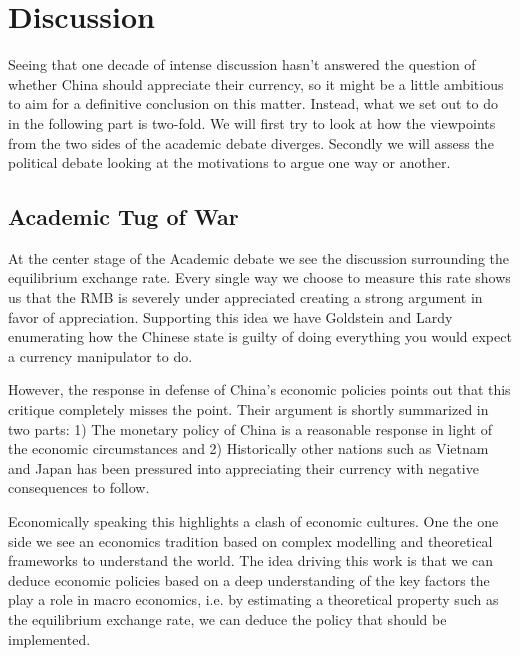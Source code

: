 \section{Discussion}
\label{sec:discussion}





Seeing that one decade of intense discussion hasn't answered the 
question of whether China should appreciate their currency, so it might 
be a little ambitious to aim for a definitive conclusion on this matter.  
Instead, what we set out to do in the following part is two-fold. We 
will first try to look at how the viewpoints from the two sides of the 
academic debate diverges. Secondly we will assess the political debate 
looking at the motivations to argue one way or another.

\subsection{Academic Tug of War}

At the center stage of the Academic debate we see the discussion 
surrounding the equilibrium exchange rate. Every single way we choose to 
measure this rate shows us that the RMB is severely under appreciated 
creating a strong argument in favor of appreciation. Supporting this 
idea we have Goldstein and Lardy enumerating how the Chinese state is 
guilty of doing everything you would expect a currency manipulator to 
do.

However, the response in defense of China's economic policies points out 
that this critique completely misses the point. Their argument is 
shortly summarized in two parts: 1) The monetary policy of China is a 
reasonable response in light of the economic circumstances and 2) 
Historically other nations such as Vietnam and Japan has been pressured 
into appreciating their currency with negative consequences to follow.

Economically speaking this highlights a clash of economic cultures. One 
the one side we see an economics tradition based on complex modelling 
and theoretical frameworks to understand the world. The idea driving 
this work is that we can deduce economic policies based on a deep 
understanding of the key factors the play a role in macro economics, 
i.e. by estimating a theoretical property such as the equilibrium 
exchange rate, we can deduce the policy that should be implemented.  

